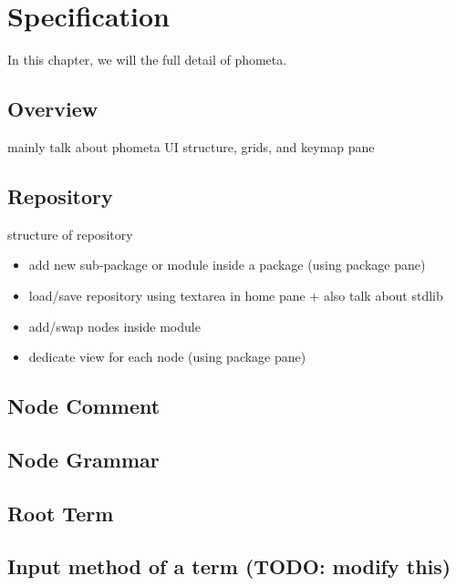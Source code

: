 \documentclass[master.tex]{subfiles}
\begin{document}
\chapter{Specification}
\label{chap:specification}

In this chapter, we will the full detail of phometa.
\section{Overview}
mainly talk about phometa UI structure, grids, and keymap pane

\section{Repository}
structure of repository
\begin{itemize}
\item add new sub-package or module inside a package (using package pane)
\item load/save repository using textarea in home pane + also talk about stdlib
\item add/swap nodes inside module
\item dedicate view for each node (using package pane)
\end{itemize}

\section{Node Comment}
\section{Node Grammar}
\section{Root Term}


\section{Input method of a term (TODO: modify this)}


\end{document}
